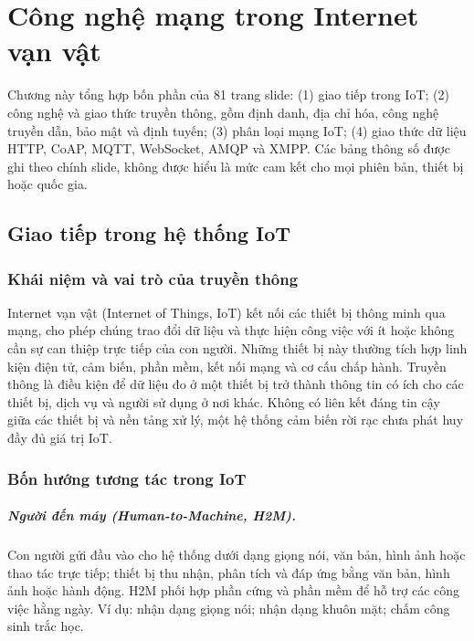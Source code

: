 \chapter{Công nghệ mạng trong Internet vạn vật}
\label{chap:iot-networking}
\begin{ghinho}[title={Mục tiêu và phạm vi}]
Chương này tổng hợp bốn phần của 81 trang slide: (1) giao tiếp trong IoT; (2) công nghệ và giao thức truyền thông, gồm định danh, địa chỉ hóa, công nghệ truyền dẫn, bảo mật và định tuyến; (3) phân loại mạng IoT; (4) giao thức dữ liệu HTTP, CoAP, MQTT, WebSocket, AMQP và XMPP. Các bảng thông số được ghi theo chính slide, không được hiểu là mức cam kết cho mọi phiên bản, thiết bị hoặc quốc gia. 
\end{ghinho}

\section{Giao tiếp trong hệ thống IoT}
\subsection{Khái niệm và vai trò của truyền thông}
Internet vạn vật (Internet of Things, IoT) kết nối các thiết bị thông minh qua mạng, cho phép chúng trao đổi dữ liệu và thực hiện công việc với ít hoặc không cần sự can thiệp trực tiếp của con người. Những thiết bị này thường tích hợp linh kiện điện tử, cảm biến, phần mềm, kết nối mạng và cơ cấu chấp hành. Truyền thông là điều kiện để dữ liệu đo ở một thiết bị trở thành thông tin có ích cho các thiết bị, dịch vụ và người sử dụng ở nơi khác. Không có liên kết đáng tin cậy giữa các thiết bị và nền tảng xử lý, một hệ thống cảm biến rời rạc chưa phát huy đầy đủ giá trị IoT. 

\subsection{Bốn hướng tương tác trong IoT}
\paragraph{Người đến máy (Human-to-Machine, H2M).} Con người gửi đầu vào cho hệ thống dưới dạng giọng nói, văn bản, hình ảnh hoặc thao tác trực tiếp; thiết bị thu nhận, phân tích và đáp ứng bằng văn bản, hình ảnh hoặc hành động. H2M phối hợp phần cứng và phần mềm để hỗ trợ các công việc hằng ngày. Ví dụ: nhận dạng giọng nói; nhận dạng khuôn mặt; chấm công sinh trắc học. 

